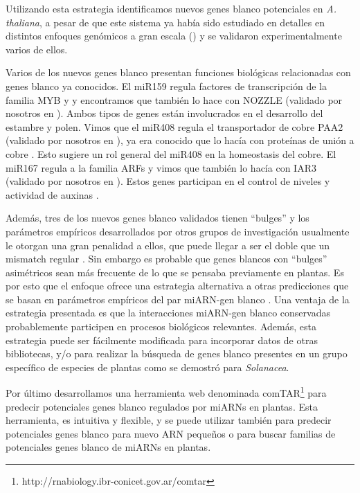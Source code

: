 Utilizando esta estrategia identificamos nuevos genes blanco potenciales en \textit{A. thaliana}, a pesar de que este sistema ya había sido estudiado en detalles en distintos enfoques genómicos a gran escala (\citep{Allen2005207,JonesRhoades2004787,Addo-quaye2009a,German2008,Rajagopalan2006,Schwab2005517}) y se validaron experimentalmente varios de ellos.

Varios de los nuevos genes blanco presentan funciones biológicas relacionadas con genes blanco ya conocidos.
El miR159 regula factores de transcripción de la familia MYB y y encontramos que también lo hace con NOZZLE (validado por nosotros en \citep{Chorostecki05072012}).
Ambos tipos de genes están involucrados en el desarrollo del estambre y polen\citep{Millar2005,Biology1999,Yang1999,pmid17916625}.
Vimos que el miR408 regula el transportador de cobre PAA2 (validado por nosotros en \citep{Chorostecki05072012}), ya era conocido que lo hacía con proteínas de unión a cobre \citep{JonesRhoades2004787,German2008,Schwab2005517,pmid15258262}.
Esto sugiere un rol general del miR408 en la homeostasis del cobre.
El miR167 regula a la familia ARFs \citep{Rhoades2002513,pmid17021043} y vimos que también lo hacía con IAR3 (validado por nosotros en \citep{Chorostecki05072012}).
Estos genes participan en el control de niveles y actividad de auxinas \citep{Davies1999,pmid15491917}.

Además, tres de los nuevos genes blanco validados tienen ``bulges'' y los parámetros empíricos desarrollados por otros grupos de investigación usualmente le otorgan una gran penalidad a ellos, que puede llegar a ser el doble que un mismatch regular \citep{JonesRhoades2004787}.
Sin embargo es probable que genes blancos con ``bulges'' asimétricos sean más frecuente de lo que se pensaba previamente en plantas.
Es por esto que el enfoque ofrece una estrategia alternativa a otras predicciones que se basan en parámetros empíricos del par miARN-gen blanco \citep{Allen2005207,JonesRhoades2004787,citeulike:8816489,Fahlgren_chapter}.
Una ventaja de la estrategia presentada es que la interacciones miARN-gen blanco conservadas probablemente participen en procesos biológicos relevantes.
Además, esta estrategia puede ser fácilmente modificada para incorporar datos de otras bibliotecas, y/o para realizar la búsqueda de genes blanco presentes en un grupo específico de especies de plantas como se demostró para \textit{Solanacea}.

Por último desarrollamos una herramienta web denominada comTAR\footnote{http://rnabiology.ibr-conicet.gov.ar/comtar} para predecir potenciales genes blanco regulados por miARNs en plantas.
Esta herramienta, es intuitiva y flexible, y se puede utilizar también para predecir potenciales genes blanco para nuevo ARN pequeños o para buscar familias de potenciales genes blanco de miARNs en plantas. 

